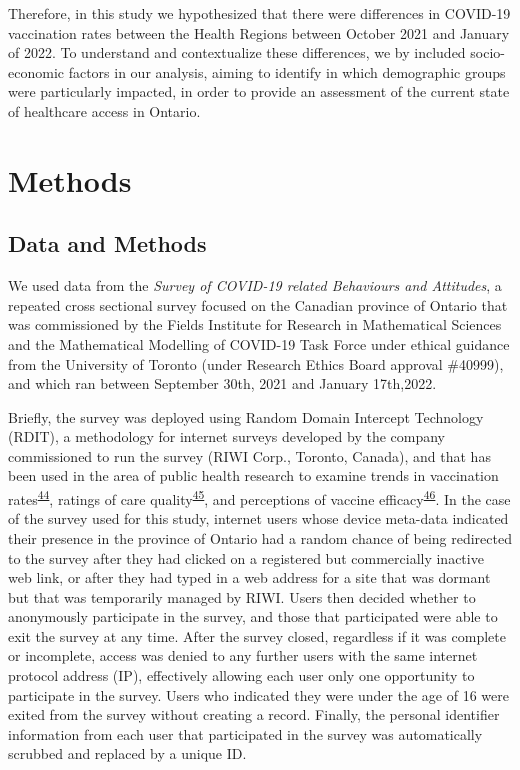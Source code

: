 \documentclass[
]{article}
\begin{document}
Therefore, in this study we hypothesized that there were differences in
COVID-19 vaccination rates between the Health Regions between October
2021 and January of 2022. To understand and contextualize these
differences, we by included socio-economic factors in our analysis,
aiming to identify in which demographic groups were particularly
impacted, in order to provide an assessment of the current state of
healthcare access in Ontario.

\hypertarget{methods}{%
\section{Methods}\label{methods}}

\hypertarget{sec-data}{%
\subsection{Data and Methods}\label{sec-data}}

We used data from the \emph{Survey of COVID-19 related Behaviours and
Attitudes}, a repeated cross sectional survey focused on the Canadian
province of Ontario that was commissioned by the Fields Institute for
Research in Mathematical Sciences and the Mathematical Modelling of
COVID-19 Task Force under ethical guidance from the University of
Toronto (under Research Ethics Board approval \#40999), and which ran
between September 30th, 2021 and January 17th,2022.

Briefly, the survey was deployed using Random Domain Intercept
Technology (RDIT), a methodology for internet surveys developed by the
company commissioned to run the survey (RIWI Corp., Toronto, Canada),
and that has been used in the area of public health research to examine
trends in vaccination
rates\textsuperscript{\protect\hyperlink{ref-sargent2022}{44}}, ratings
of care quality\textsuperscript{\protect\hyperlink{ref-kim2021}{45}},
and perceptions of vaccine
efficacy\textsuperscript{\protect\hyperlink{ref-seeman2010}{46}}. In the
case of the survey used for this study, internet users whose device
meta-data indicated their presence in the province of Ontario had a
random chance of being redirected to the survey after they had clicked
on a registered but commercially inactive web link, or after they had
typed in a web address for a site that was dormant but that was
temporarily managed by RIWI. Users then decided whether to anonymously
participate in the survey, and those that participated were able to exit
the survey at any time. After the survey closed, regardless if it was
complete or incomplete, access was denied to any further users with the
same internet protocol address (IP), effectively allowing each user only
one opportunity to participate in the survey. Users who indicated they
were under the age of 16 were exited from the survey without creating a
record. Finally, the personal identifier information from each user that
participated in the survey was automatically scrubbed and replaced by a
unique ID.
\end{document}
